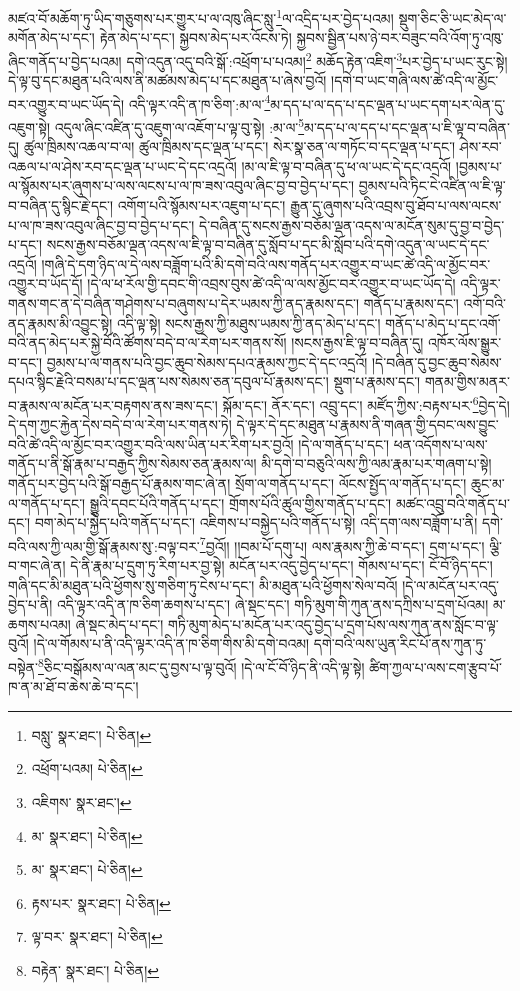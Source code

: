 མཛའ་བོ་མཆོག་ཏུ་ཡིད་གཅུགས་པར་གྱུར་པ་ལ་འཁུ་ཞིང་སླུ་\footnote{བསླུ་  སྣར་ཐང་།  པེ་ཅིན། }ལ་འདྲིད་པར་བྱེད་པའམ། སྡུག་ཅིང་ཅི་ཡང་མེད་ལ་མགོན་མེད་པ་དང་། རྟེན་མེད་པ་དང་། སྐྱབས་མེད་པར་འོངས་ཏེ། སྐྱབས་སྦྱིན་པས་ཉེ་བར་བཟུང་བའི་འོག་ཏུ་འཁུ་ཞིང་གནོད་པ་བྱེད་པའམ། དགེ་འདུན་འདུ་བའི་སྒོ་:འཕྲོག་པ་པའམ།\footnote{འཕྲོག་པའམ།  པེ་ཅིན། } མཆོད་རྟེན་འཇིག་\footnote{འཇིགས་  སྣར་ཐང་། }པར་བྱེད་པ་ཡང་རུང་སྟེ། དེ་ལྟ་བུ་དང་མཐུན་པའི་ལས་ནི་མཚམས་མེད་པ་དང་མཐུན་པ་ཞེས་བྱའོ། །དགེ་བ་ཡང་གཞི་ལས་ཚེ་འདི་ལ་མྱོང་བར་འགྱུར་བ་ཡང་ཡོད་དེ། འདི་ལྟར་འདི་ན་ཁ་ཅིག་:མ་ལ་\footnote{མ་  སྣར་ཐང་།  པེ་ཅིན། }མ་དད་པ་ལ་དད་པ་དང་ལྡན་པ་ཡང་དག་པར་ལེན་དུ་འཇུག་སྟེ། འདུལ་ཞིང་འཛིན་དུ་འཇུག་ལ་འཇོག་པ་ལྟ་བུ་སྟེ། :མ་ལ་\footnote{མ་  སྣར་ཐང་།  པེ་ཅིན། }མ་དད་པ་ལ་དད་པ་དང་ལྡན་པ་ཇི་ལྟ་བ་བཞིན་དུ། ཚུལ་ཁྲིམས་འཆལ་བ་ལ། ཚུལ་ཁྲིམས་དང་ལྡན་པ་དང་། སེར་སྣ་ཅན་ལ་གཏོང་བ་དང་ལྡན་པ་དང་། ཤེས་རབ་འཆལ་པ་ལ་ཤེས་རབ་དང་ལྡན་པ་ཡང་དེ་དང་འདྲའོ། །མ་ལ་ཇི་ལྟ་བ་བཞིན་དུ་ཕ་ལ་ཡང་དེ་དང་འདྲའོ། །བྱམས་པ་ལ་སྙོམས་པར་ཞུགས་པ་ལས་ལངས་པ་ལ་ཁ་ཟས་འབུལ་ཞིང་བྱ་བ་བྱེད་པ་དང་། བྱམས་པའི་ཏིང་ངེ་འཛིན་ལ་ཇི་ལྟ་བ་བཞིན་དུ་སྙིང་རྗེ་དང་། འགོག་པའི་སྙོམས་པར་འཇུག་པ་དང་། རྒྱུན་དུ་ཞུགས་པའི་འབྲས་བུ་ཐོབ་པ་ལས་ལངས་པ་ལ་ཁ་ཟས་འབུལ་ཞིང་བྱ་བ་བྱེད་པ་དང་། དེ་བཞིན་དུ་སངས་རྒྱས་བཅོམ་ལྡན་འདས་ལ་མངོན་སུམ་དུ་བྱ་བ་བྱེད་པ་དང་། སངས་རྒྱས་བཅོམ་ལྡན་འདས་ལ་ཇི་ལྟ་བ་བཞིན་དུ་སློབ་པ་དང་མི་སློབ་པའི་དགེ་འདུན་ལ་ཡང་དེ་དང་འདྲའོ། །གཞི་དེ་དག་ཉིད་ལ་དེ་ལས་བཟློག་པའི་མི་དགེ་བའི་ལས་གནོད་པར་འགྱུར་བ་ཡང་ཚེ་འདི་ལ་མྱོང་བར་འགྱུར་བ་ཡོད་དོ། །དེ་ལ་ཕ་རོལ་གྱི་དབང་གི་འབྲས་བུས་ཚེ་འདི་ལ་ལས་མྱོང་བར་འགྱུར་བ་ཡང་ཡོད་དེ། འདི་ལྟར་གནས་གང་ན་དེ་བཞིན་གཤེགས་པ་བཞུགས་པ་དེར་ཡམས་ཀྱི་ནད་རྣམས་དང་། གནོད་པ་རྣམས་དང་། འགོ་བའི་ནད་རྣམས་མི་འབྱུང་སྟེ། འདི་ལྟ་སྟེ། སངས་རྒྱས་ཀྱི་མཐུས་ཡམས་ཀྱི་ནད་མེད་པ་དང་། གནོད་པ་མེད་པ་དང་འགོ་བའི་ནད་མེད་པར་སྐྱེ་བོའི་ཚོགས་བདེ་བ་ལ་རེག་པར་གནས་སོ། །སངས་རྒྱས་ཇི་ལྟ་བ་བཞིན་དུ། འཁོར་ལོས་སྒྱུར་བ་དང་། བྱམས་པ་ལ་གནས་པའི་བྱང་ཆུབ་སེམས་དཔའ་རྣམས་ཀྱང་དེ་དང་འདྲའོ། །དེ་བཞིན་དུ་བྱང་ཆུབ་སེམས་དཔའ་སྙིང་རྗེའི་བསམ་པ་དང་ལྡན་པས་སེམས་ཅན་དབུལ་པོ་རྣམས་དང་། སྡུག་པ་རྣམས་དང་། གནམ་གྱིས་མནར་བ་རྣམས་ལ་མངོན་པར་བརྟགས་ནས་ཟས་དང་། སྐོམ་དང་། ནོར་དང་། འབྲུ་དང་། མཛོད་ཀྱིས་:བརྟས་པར་\footnote{རྟས་པར་  སྣར་ཐང་།  པེ་ཅིན། }བྱེད་དེ། དེ་དག་ཀྱང་རྐྱེན་དེས་བདེ་བ་ལ་རེག་པར་གནས་ཏེ། དེ་ལྟར་དེ་དང་མཐུན་པ་རྣམས་ནི་གཞན་གྱི་དབང་ལས་བྱུང་བའི་ཚེ་འདི་ལ་མྱོང་བར་འགྱུར་བའི་ལས་ཡིན་པར་རིག་པར་བྱའོ། །དེ་ལ་གནོད་པ་དང་། ཕན་འདོགས་པ་ལས་གནོད་པ་ནི་སྒོ་རྣམ་པ་བརྒྱད་ཀྱིས་སེམས་ཅན་རྣམས་ལ། མི་དགེ་བ་བཅུའི་ལས་ཀྱི་ལམ་རྣམ་པར་གཞག་པ་སྟེ། གནོད་པར་བྱེད་པའི་སྒོ་བརྒྱད་པོ་རྣམས་གང་ཞེ་ན། སྲོག་ལ་གནོད་པ་དང་། ལོངས་སྤྱོད་ལ་གནོད་པ་དང་། ཆུང་མ་ལ་གནོད་པ་དང་། སྒྱུའི་དབང་པོའི་གནོད་པ་དང་། གྲོགས་པོའི་ཚུལ་གྱིས་གནོད་པ་དང་། མཚང་འབྲུ་བའི་གནོད་པ་དང་། བག་མེད་པ་སྐྱེད་པའི་གནོད་པ་དང་། འཇིགས་པ་བསྐྱེད་པའི་གནོད་པ་སྟེ། འདི་དག་ལས་བཟློག་པ་ནི། དགེ་བའི་ལས་ཀྱི་ལམ་གྱི་སྒོ་རྣམས་སུ་:བལྟ་བར་\footnote{ལྟ་བར་  སྣར་ཐང་།  པེ་ཅིན། }བྱའོ།། །།བམ་པོ་དགུ་པ། ལས་རྣམས་ཀྱི་ཆེ་བ་དང་། དྲག་པ་དང་། ལྕི་བ་གང་ཞེ་ན། དེ་ནི་རྣམ་པ་དྲུག་ཏུ་རིག་པར་བྱ་སྟེ། མངོན་པར་འདུ་བྱེད་པ་དང་། གོམས་པ་དང་། ངོ་བོ་ཉིད་དང་། གཞི་དང་མི་མཐུན་པའི་ཕྱོགས་སུ་གཅིག་ཏུ་ངེས་པ་དང་། མི་མཐུན་པའི་ཕྱོགས་སེལ་བའོ། །དེ་ལ་མངོན་པར་འདུ་བྱེད་པ་ནི། འདི་ལྟར་འདི་ན་ཁ་ཅིག་ཆགས་པ་དང་། ཞེ་སྡང་དང་། གཏི་མུག་གི་ཀུན་ནས་དཀྲིས་པ་དྲག་པོའམ། མ་ཆགས་པའམ། ཞེ་སྡང་མེད་པ་དང་། གཏི་མུག་མེད་པ་མངོན་པར་འདུ་བྱེད་པ་དྲག་པོས་ལས་ཀུན་ནས་སློང་བ་ལྟ་བུའོ། །དེ་ལ་གོམས་པ་ནི་འདི་ལྟར་འདི་ན་ཁ་ཅིག་གིས་མི་དགེ་བའམ། དགེ་བའི་ལས་ཡུན་རིང་པོ་ནས་ཀུན་ཏུ་བསྟེན་\footnote{བརྟེན་  སྣར་ཐང་།  པེ་ཅིན། }ཅིང་བསྒོམས་ལ་ལན་མང་དུ་བྱས་པ་ལྟ་བུའོ། །དེ་ལ་ངོ་བོ་ཉིད་ནི་འདི་ལྟ་སྟེ། ཚིག་ཀྱལ་པ་ལས་ངག་རྩུབ་པོ་ཁ་ན་མ་ཐོ་བ་ཆེས་ཆེ་བ་དང་། 
